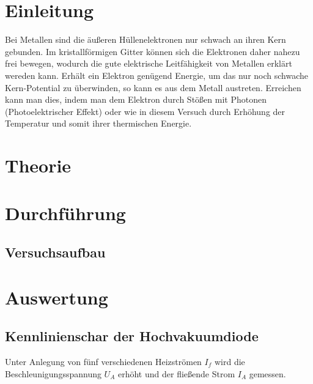 
\section{Einleitung}
Bei Metallen sind die äußeren Hüllenelektronen nur schwach an ihren Kern gebunden. Im kristallförmigen Gitter können sich die Elektronen daher nahezu frei bewegen, wodurch die gute elektrische Leitfähigkeit von Metallen erklärt wereden kann.
Erhält ein Elektron genügend Energie, um das nur noch schwache Kern-Potential zu überwinden, so kann es aus dem Metall austreten.
Erreichen kann man dies, indem man dem Elektron durch Stößen mit Photonen (Photoelektrischer Effekt) oder wie in diesem Versuch durch Erhöhung der Temperatur und somit ihrer thermischen Energie.

\section{Theorie}

\section{Durchführung}
\subsection{Versuchsaufbau}

\section{Auswertung}
\subsection{Kennlinienschar der Hochvakuumdiode}
Unter Anlegung von fünf verschiedenen Heizströmen $I_f$ wird die Beschleunigungsspannung $U_A$ erhöht und der fließende Strom $I_A$ 
gemessen. 

